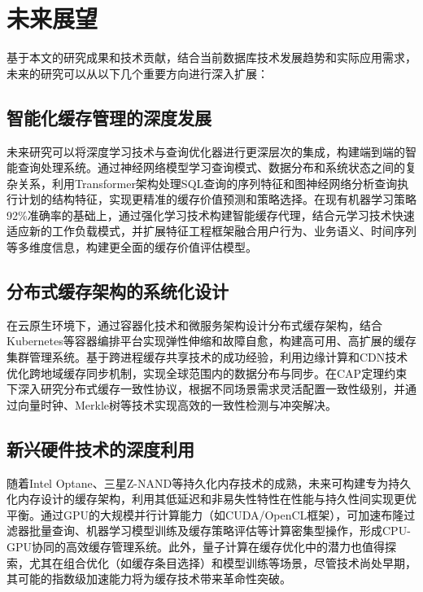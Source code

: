 \section{未来展望}

基于本文的研究成果和技术贡献，结合当前数据库技术发展趋势和实际应用需求，未来的研究可以从以下几个重要方向进行深入扩展：

\subsection{智能化缓存管理的深度发展}

未来研究可以将深度学习技术与查询优化器进行更深层次的集成，构建端到端的智能查询处理系统。通过神经网络模型学习查询模式、数据分布和系统状态之间的复杂关系，利用Transformer架构处理SQL查询的序列特征和图神经网络分析查询执行计划的结构特征，实现更精准的缓存价值预测和策略选择。在现有机器学习策略92\%准确率的基础上，通过强化学习技术构建智能缓存代理，结合元学习技术快速适应新的工作负载模式，并扩展特征工程框架融合用户行为、业务语义、时间序列等多维度信息，构建更全面的缓存价值评估模型。

\subsection{分布式缓存架构的系统化设计}

在云原生环境下，通过容器化技术和微服务架构设计分布式缓存架构，结合Kubernetes等容器编排平台实现弹性伸缩和故障自愈，构建高可用、高扩展的缓存集群管理系统。基于跨进程缓存共享技术的成功经验，利用边缘计算和CDN技术优化跨地域缓存同步机制，实现全球范围内的数据分布与同步。在CAP定理约束下深入研究分布式缓存一致性协议，根据不同场景需求灵活配置一致性级别，并通过向量时钟、Merkle树等技术实现高效的一致性检测与冲突解决。

\subsection{新兴硬件技术的深度利用}

随着Intel Optane、三星Z-NAND等持久化内存技术的成熟，未来可构建专为持久化内存设计的缓存架构，利用其低延迟和非易失性特性在性能与持久性间实现更优平衡。通过GPU的大规模并行计算能力（如CUDA/OpenCL框架），可加速布隆过滤器批量查询、机器学习模型训练及缓存策略评估等计算密集型操作，形成CPU-GPU协同的高效缓存管理系统。此外，量子计算在缓存优化中的潜力也值得探索，尤其在组合优化（如缓存条目选择）和模型训练等场景，尽管技术尚处早期，其可能的指数级加速能力将为缓存技术带来革命性突破。